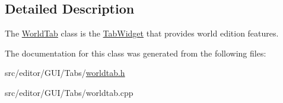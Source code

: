 \subsection{\-Detailed \-Description}
\-The \hyperlink{class_world_tab}{\-World\-Tab} class is the \hyperlink{class_tab_widget}{\-Tab\-Widget} that provides world edition features. 

\-The documentation for this class was generated from the following files\-:\begin{DoxyCompactItemize}
\item 
src/editor/\-G\-U\-I/\-Tabs/\hyperlink{worldtab_8h}{worldtab.\-h}\item 
src/editor/\-G\-U\-I/\-Tabs/worldtab.\-cpp\end{DoxyCompactItemize}
